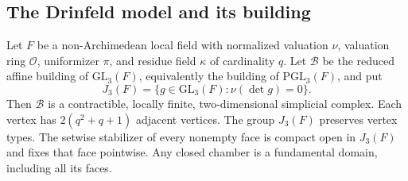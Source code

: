 \subsection{The Drinfeld model and its building}

\begin{lemma}\label{h3:lem:rank-three-building}
Let $F$ be a non-Archimedean local field with normalized valuation $\nu$,
valuation ring $\mathcal O$, uniformizer $\pi$, and residue field $\kappa$
of cardinality $q$.  Let $\mathcal B$ be the reduced affine building of
$\mathrm{GL}_3(F)$, equivalently the building of $\mathrm{PGL}_3(F)$, and put
\[
 J_3(F)=\{g\in\mathrm{GL}_3(F):\nu(\det g)=0\}.
\]
Then $\mathcal B$ is a contractible, locally finite, two-dimensional
simplicial complex.  Each vertex has $2(q^2+q+1)$ adjacent vertices.
The group $J_3(F)$ preserves vertex types.  The setwise stabilizer of every
nonempty face is compact open in $J_3(F)$ and fixes that face pointwise.
Any closed chamber is a fundamental domain, including all its faces.
\end{lemma}

